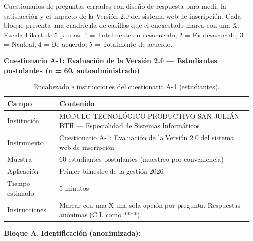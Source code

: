 
\providecommand{\casilla}{\framebox[0.38cm]{\rule{0pt}{0.33cm}}}

Cuestionarios de preguntas cerradas con diseño de respuesta para medir la satisfacción y el impacto de la Versión 2.0 del sistema web de inscripción. Cada bloque presenta una cuadrícula de casillas que el encuestado marca con una X. Escala Likert de 5 puntos: 1 = Totalmente en desacuerdo, 2 = En desacuerdo, 3 = Neutral, 4 = De acuerdo, 5 = Totalmente de acuerdo.

\noindent\textbf{Cuestionario A-1: Evaluación de la Versión 2.0 --- Estudiantes postulantes (n = 60, autoadministrado)}

\begin{table}[htbp]
    \centering
    \caption{Encabezado e instrucciones del cuestionario A-1 (estudiantes).}
    \label{tab:a1_encabezado}
    \begin{tabularx}{\textwidth}{p{} X}
        \toprule
        \textbf{Campo} & \textbf{Contenido} \\
        \midrule
        Institución & MÓDULO TECNOLÓGICO PRODUCTIVO SAN JULIÁN BTH --- Especialidad de Sistemas Informáticos \\
        Instrumento & Cuestionario A-1: Evaluación de la Versión 2.0 del sistema web de inscripción \\
        Muestra & 60 estudiantes postulantes (muestreo por conveniencia) \\
        Aplicación & Primer bimestre de la gestión 2026 \\
        Tiempo estimado & 5 minutos \\
        Instrucciones & Marcar con una X una sola opción por pregunta. Respuestas anónimas (C.I. como ****). \\
        \bottomrule
    \end{tabularx}
\end{table}

\noindent\textbf{Bloque A. Identificación (anonimizada):}

